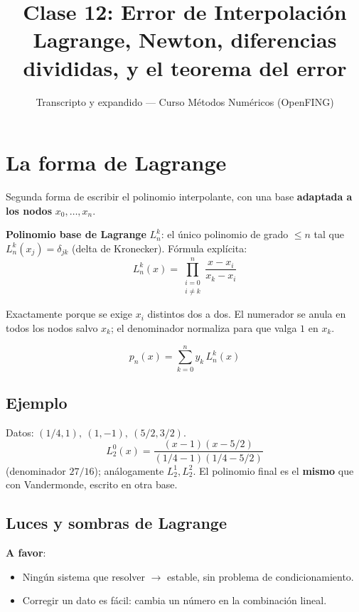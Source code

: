 \documentclass[12pt,a4paper]{article}
\title{\textbf{Clase 12: Error de Interpolación} \\[0.3em]
        \large{Lagrange, Newton, diferencias divididas, y el teorema del error}}
\author{Transcripto y expandido --- Curso Métodos Numéricos (OpenFING)}
\date{}
\begin{document}
\maketitle
\thispagestyle{empty}
\newpage

\tableofcontents
\newpage

\section{La forma de Lagrange}

Segunda forma de escribir el polinomio interpolante, con una base
\textbf{adaptada a los nodos} $x_0,\dots,x_n$.

\textbf{Polinomio base de Lagrange} $L_n^k$: el único polinomio de grado
$\leq n$ tal que $L_n^k(x_j) = \delta_{jk}$ (delta de Kronecker). Fórmula
explícita:
$$L_n^k(x) = \prod_{\substack{i=0\\ i\neq k}}^{n} \frac{x - x_i}{x_k - x_i}$$

\begin{notebox}
Exactamente porque se exige $x_i$ distintos dos a dos. El numerador se
anula en todos los nodos salvo $x_k$; el denominador normaliza para que
valga $1$ en $x_k$.
\end{notebox}

\begin{keybox}
$$p_n(x) = \sum_{k=0}^{n} y_k\, L_n^k(x)$$
\end{keybox}

\subsection{Ejemplo}

Datos: $(1/4,1),\ (1,-1),\ (5/2,3/2)$.
$$L_2^0(x) = \frac{(x-1)(x-5/2)}{(1/4-1)(1/4-5/2)}$$
(denominador $27/16$); análogamente $L_2^1,L_2^2$. El polinomio final es
el \textbf{mismo} que con Vandermonde, escrito en otra base.

\subsection{Luces y sombras de Lagrange}

\textbf{A favor}:
\begin{itemize}
  \item Ningún sistema que resolver $\to$ estable, sin problema de
  condicionamiento.
  \item Corregir un dato es fácil: cambia un número en la combinación
  lineal.
\end{itemize}
\end{document}
